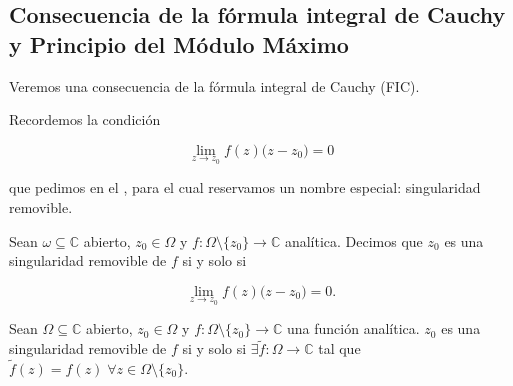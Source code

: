 \documentclass[../main.tex]{subfiles}
\begin{document}
\subsection{Consecuencia de la fórmula integral de Cauchy y Principio del Módulo Máximo}

Veremos una consecuencia de la fórmula integral de Cauchy (FIC).

\begin{remark}
    Recordemos la condición

    \begin{equation*}
        \lim_{z \to z_{0}} f(z)\bigl(z - z_{0}\bigr) = 0
    \end{equation*}

    que pedimos en el ,
    para el cual reservamos un nombre especial: singularidad removible.
\end{remark}

\begin{definition}
    Sean \(\omega \subseteq \mathbb{C}\) abierto, \(z_{0}\in  \Omega\) y \(f \colon
    \Omega\setminus \{z_{0}\} \to \mathbb{C}\) analítica. Decimos que \(z_{0}\) es una
    singularidad removible de \(f\) si y solo si

    \begin{equation*}
        \lim_{z \to z_{0}} f(z)\bigl(z - z_{0}\bigr) = 0.
    \end{equation*}
\end{definition}

\begin{proposition}
    Sean \(\Omega \subseteq \mathbb{C}\) abierto, \(z_{0}\in \Omega\) y \(f \colon
    \Omega\setminus \{z_{0}\} \to \mathbb{C}\) una función analítica. \(z_{0}\) es una
    singularidad removible de \(f\) si y solo si \(\exists \tilde{f} \colon \Omega \to
    \mathbb{C}\) tal que \(\tilde{f}(z) = f(z)\; \forall z\in \Omega\setminus
    \{z_{0}\}\).
\end{proposition}
\end{document}
